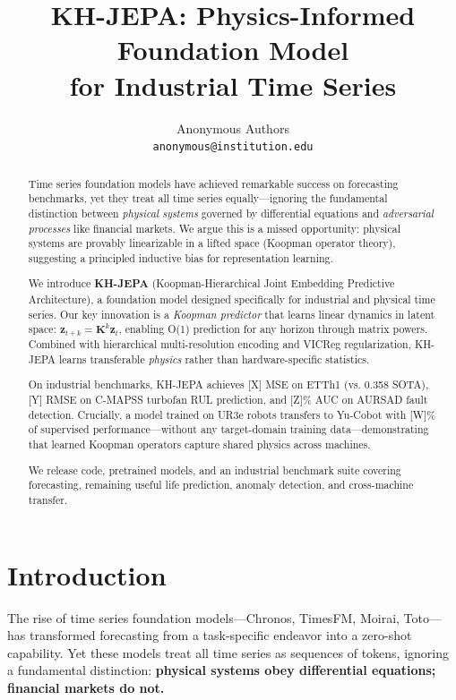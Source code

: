 \documentclass{article}
\title{\textbf{KH-JEPA: Physics-Informed Foundation Model\\for Industrial Time Series}}
\author{
  Anonymous Authors\\
  \texttt{anonymous@institution.edu}
}
\date{}
\begin{document}
\maketitle

\begin{abstract}
Time series foundation models have achieved remarkable success on forecasting benchmarks, yet they treat all time series equally—ignoring the fundamental distinction between \emph{physical systems} governed by differential equations and \emph{adversarial processes} like financial markets. We argue this is a missed opportunity: physical systems are provably linearizable in a lifted space (Koopman operator theory), suggesting a principled inductive bias for representation learning.

We introduce \textbf{KH-JEPA} (Koopman-Hierarchical Joint Embedding Predictive Architecture), a foundation model designed specifically for industrial and physical time series. Our key innovation is a \emph{Koopman predictor} that learns linear dynamics in latent space: $\mathbf{z}_{t+k} = \mathbf{K}^k \mathbf{z}_t$, enabling O(1) prediction for any horizon through matrix powers. Combined with hierarchical multi-resolution encoding and VICReg regularization, KH-JEPA learns transferable \emph{physics} rather than hardware-specific statistics.

On industrial benchmarks, KH-JEPA achieves [X] MSE on ETTh1 (vs. 0.358 SOTA), [Y] RMSE on C-MAPSS turbofan RUL prediction, and [Z]\% AUC on AURSAD fault detection. Crucially, a model trained on UR3e robots transfers to Yu-Cobot with [W]\% of supervised performance—without any target-domain training data—demonstrating that learned Koopman operators capture shared physics across machines.

We release code, pretrained models, and an industrial benchmark suite covering forecasting, remaining useful life prediction, anomaly detection, and cross-machine transfer.
\end{abstract}

\section{Introduction}

The rise of time series foundation models—Chronos, TimesFM, Moirai, Toto—has transformed forecasting from a task-specific endeavor into a zero-shot capability. Yet these models treat all time series as sequences of tokens, ignoring a fundamental distinction: \textbf{physical systems obey differential equations; financial markets do not.}
\end{document}

